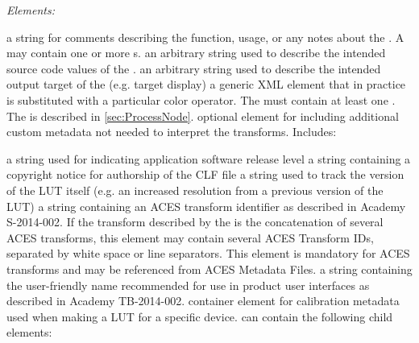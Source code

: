\emph{Elements:}
\begin{xmlfields}
    \xmlitem[Description][required] a string for comments describing the function, usage, or any notes about the . A  may contain one or more s.
    \xmlitem[InputDescriptor][optional] an arbitrary string used to describe the intended source code values of the .
    \xmlitem[OutputDescriptor][optional] an arbitrary string used to describe the intended output target of the  (e.g. target display)
    \xmlitem[ProcessNode][required] a generic XML element that in practice is substituted with a particular color operator. The  must contain at least one . The  is described in \autoref{sec:ProcessNode}.
    \xmlitem[Info][optional] optional element for including additional custom metadata not needed to interpret the transforms. Includes:
        \begin{xmlfields}
            \xmlitem[AppRelease][optional] a string used for indicating application software release level
            \xmlitem[Copyright][optional] a string containing a copyright notice for authorship of the CLF file
            \xmlitem[Revision][optional] a string used to track the version of the LUT itself (e.g. an increased resolution from a previous version of the LUT)
            \xmlitem[ACEStransformID][optional] a string containing an ACES transform identifier as described in Academy S-2014-002. If the transform described by the  is the concatenation of several ACES transforms, this element may contain several ACES Transform IDs, separated by white space or line separators. This element is mandatory for ACES transforms and may be referenced from ACES Metadata Files. 
            \xmlitem[ACESuserName][optional] a string containing the user-friendly name recommended for use in product user interfaces as described in Academy TB-2014-002.
            \xmlitem[CalibrationInfo][optional] container element for calibration metadata used when making a LUT for a specific device.  can contain the following child elements:
                \begin{list}{}{\setlength{\itemsep}{4pt}}
                    \item {}
                    \item {}
                    \item {}
                    \item {}
                    \item {}
                    \item {}
                    \item {}
                \end{list}
        \end{xmlfields}
\end{xmlfields}